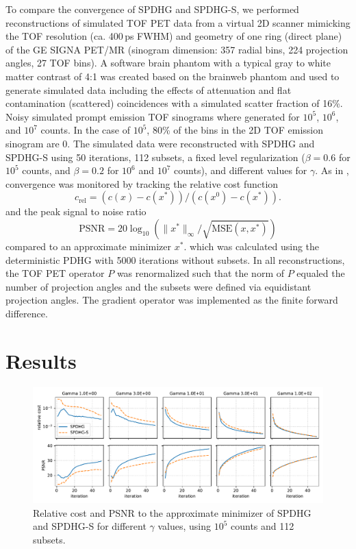 \documentclass[11pt,twocolumn,twoside]{article}
\begin{document}
To compare the convergence of SPDHG and SPDHG-S, we performed reconstructions of simulated
TOF PET data from a virtual 2D scanner mimicking the TOF resolution (ca. 400\,ps FWHM) and 
geometry of one ring (direct plane) of the GE SIGNA PET/MR (sinogram dimension: 
357 radial bins, 224 projection angles, 27 TOF bins).
A software brain phantom with a typical gray to white matter contrast of 4:1 was created
based on the brainweb phantom and used to generate simulated data including the effects
of attenuation and flat contamination (scattered) coincidences
with a simulated scatter fraction of 16\%.
Noisy simulated prompt emission TOF sinograms where generated for $10^5$, $10^6$, 
and $10^7$ counts. 
In the case of $10^5$, 80\% of the bins in the 2D TOF emission sinogram are 0.
The simulated data were reconstructed with SPDHG and SPDHG-S using 50 iterations, 112 subsets,
a fixed level regularization ($\beta = 0.6$ for $10^5$ counts, and $\beta = 0.2$ for $10^6$
and $10^7$ counts), and different values for $\gamma$.
As in \cite{Ehrhardt2019}, convergence was monitored by tracking the relative cost function
\[ c_\text{rel} = (c(x) - c(x^*)) / (c(x^0) - c(x^*)). \]
and the peak signal to noise ratio 
\[ \text{PSNR} = 20 \log_{10} (\|x^*\|_\infty/\sqrt{\text{MSE}(x,x^*)}) \]
compared to an approximate minimizer $x^*$.
which was calculated using the deterministic PDHG with 5000 iterations without subsets.
In all reconstructions, the TOF PET operator $P$ was renormalized such that the norm of $P$
equaled the number of projection angles and the
subsets were defined via equidistant projection angles.
The gradient operator was implemented as the finite forward difference.




\section{Results}

\begin{figure}
  \centering
  \includegraphics[width=1.0\textwidth]{./figs/brain2d_counts_1.0E+05_beta_6.0E-01_niter_5000_50_nsub_112_metrics.pdf}
  \caption{Relative cost and PSNR to the approximate minimizer of SPDHG and SPDHG-S for different
           $\gamma$ values, using $10^5$ counts and 112 subsets.}
  \label{fig:metrics}
\end{figure}
\end{document}
